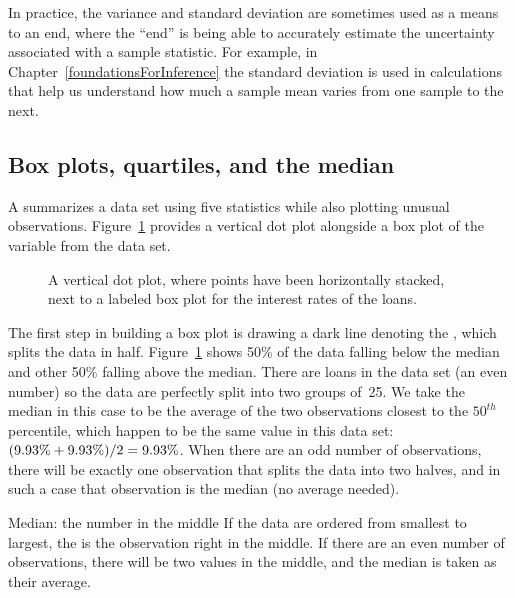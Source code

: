 In practice, the variance and standard deviation are sometimes
used as a means to an end, where the ``end'' is being able to
accurately estimate the uncertainty associated with a sample
statistic.
For example, in Chapter~\ref{foundationsForInference}
the standard deviation is used in calculations that help us
understand how much a sample mean varies from one sample
to the next.


\D{\newpage}

\subsection{Box plots, quartiles, and the median}

A  summarizes a data set using five
statistics while also plotting unusual observations.
Figure~\ref{loan_int_rate_box_plot_layout} provides
a vertical dot plot alongside a box plot of the
 variable from
the  data set.

\begin{figure}[h]
  \centering
  \caption{A vertical dot plot, where points have been
      horizontally stacked, next to a labeled box plot
      for the interest rates of the \loanN{} loans.}
  \label{loan_int_rate_box_plot_layout}
\end{figure}

The first step in building a box plot is drawing a dark line
denoting the , which splits the data in half.
Figure~\ref{loan_int_rate_box_plot_layout} shows 50\% of the
data falling below the median and other 50\% falling above
the median.
There are \loanN{} loans in the data set
(an even number) so the data are perfectly split into two
groups of~25.
We take the median in this case to be the average of the
two observations closest to the $50^{th}$ percentile,
which happen to be the same value in this data set:
$(\text{9.93\%{}} + \text{9.93\%{}}) / 2
  = \text{9.93\%{}}$.
When there are an odd number of observations,
there will be exactly one observation that splits the data
into two halves, and in such a case that observation
is the median (no average needed).

\begin{onebox}{Median: the number in the middle}
  If the data are ordered from smallest to largest,
  the  is the observation right in the middle.
  If there are an even number of observations,
  there will be two values in the middle,
  and the median is taken as their average.
\end{onebox}

